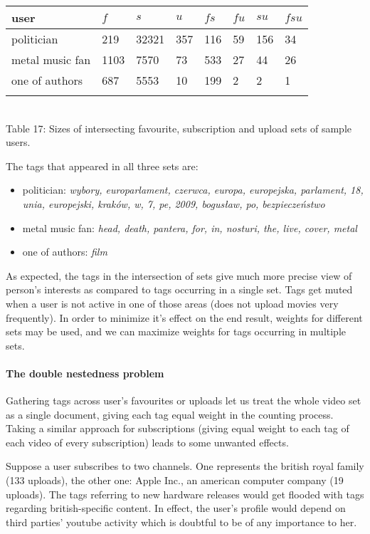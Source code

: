 \begin{center}
\begin{tabular}{| l | l | l | l | l | l | l | l |}
user & $f$ & $s$ & $u$ & $fs$ & $fu$ & $su$ & $fsu$ \\ \hline
politician & 219 & 32321 & 357 & 116 & 59 & 156 & 34 \\
metal music fan & 1103 & 7570 & 73 & 533 & 27 & 44 & 26 \\
one of authors & 687 & 5553 & 10 & 199 & 2 & 2 & 1 \\
\label{intersections}
\end{tabular} \\
Table 17: Sizes of intersecting favourite, subscription and upload sets of sample users. \\
\end{center}

The tags that appeared in all three sets are:
\begin{itemize}
  \item{politician: \emph{wybory, europarlament, czerwca, europa, europejska,
  parlament, 18, unia, europejski, kraków, w, 7, pe, 2009, bogusław, po,
  bezpieczeństwo}}
  \item{metal music fan: \emph{head, death, pantera, for, in, nosturi, the, live, cover, metal}}
  \item{one of authors: \emph{film}}
\end{itemize}

As expected, the tags in the intersection of sets give much more precise view of person's
interests as compared to tags occurring in a single set. Tags get muted when a user is not active in one of
those areas (\eg does not upload movies very frequently). In order to minimize it's effect on the
end result, weights for different sets may be used, and we can maximize weights for tags occurring
in multiple sets.

\paragraph{The double nestedness problem}
Gathering tags across user's favourites or uploads let us treat the whole video
set as a single document, giving each tag equal weight in the counting process.
Taking a similar approach for subscriptions (\eg giving equal weight to each
tag of each video of every subscription) leads to some unwanted effects.

Suppose a user subscribes to two channels. One represents the british royal
family (133 uploads), the other one: Apple Inc., an american computer company
(19 uploads). The tags referring to new hardware releases would get flooded with
tags regarding british-specific content. In effect, the user's profile would
depend on third parties' youtube activity which is doubtful to be of any
importance to her.


